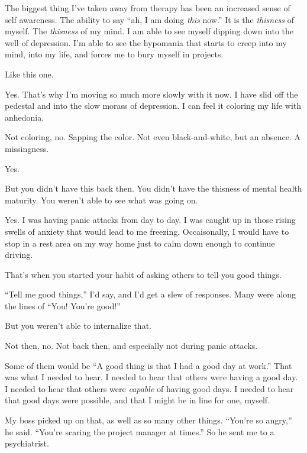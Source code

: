 \begin{paracol}{2}
\begin{leftcolumn}
The biggest thing I've taken away from therapy has been an increased sense of self awareness. The ability to say ``ah, I am doing \emph{this} now.'' It is the \emph{thisness} of myself. The \emph{thisness} of my mind. I am able to see myself dipping down into the well of depression. I'm able to see the hypomania that starts to creep into my mind, into my life, and forces me to bury myself in projects.

\begin{ally}
Like this one.
\end{ally}
Yes. That's why I'm moving so much more slowly with it now. I have slid off the pedestal and into the slow morass of depression. I can feel it coloring my life with anhedonia.

\begin{ally}
Not coloring, no. Sapping the color. Not even black-and-white, but an absence. A missingness.
\end{ally}
Yes.

\begin{ally}
But you didn't have this back then. You didn't have the thisness of mental health maturity. You weren't able to see what was going on.
\end{ally}
Yes. I was having panic attacks from day to day. I was caught up in those rising swells of anxiety that would lead to me freezing. Occaisonally, I would have to stop in a rest area on my way home just to calm down enough to continue driving.

\begin{ally}
That's when you started your habit of asking others to tell you good things.
\end{ally}
``Tell me good things,'' I'd say, and I'd get a slew of responses. Many were along the lines of ``You! You're good!''

\begin{ally}
But you weren't able to internalize that.
\end{ally}
Not then, no. Not back then, and especially not during panic attacks.

Some of them would be ``A good thing is that I had a good day at work.'' That was what I needed to hear. I needed to hear that others were having a good day. I needed to hear that others were \emph{capable} of having good days. I needed to hear that good days were possible, and that I might be in line for one, myself.

My boss picked up on that, as well as so many other things. ``You're so angry,'' he said. ``You're scaring the project manager at times.'' So he sent me to a psychiatrist.


\end{leftcolumn}
\end{paracol}
